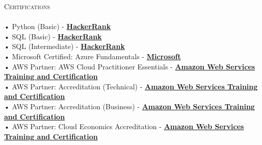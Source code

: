 \documentclass[a4paper]{article}
\newcommand{\lineunder} {
    \vspace*{-8pt} \\
    \hspace*{-18pt} \hrulefill \\
}
\newcommand{\header} [1] {
    {\hspace*{-18pt}\vspace*{6pt} \textsc{#1}}
    \vspace*{-6pt} \lineunder
}
\begin{document}
      \header{Certifications}
      \vspace{1mm}
      • Python (Basic) - \textbf{\href{https://www.hackerrank.com/certificates/bfc07157a748}{HackerRank}}\\
\vspace*{1mm}
      • SQL (Basic) - \textbf{\href{https://www.hackerrank.com/certificates/8501a5b92f0c}{HackerRank}}\\
\vspace*{1mm}
      • SQL (Intermediate) - \textbf{\href{https://www.hackerrank.com/certificates/e3048e67ed0a}{HackerRank}}\\
\vspace*{1mm}
      • Microsoft Certified: Azure Fundamentals - \textbf{\href{https://www.credly.com/badges/b9331203-6ef9-4fd2-911d-e0930648c95c?source=linked\_in\_profile}{Microsoft}}\\
\vspace*{1mm}
      • AWS Partner: AWS Cloud Practitioner Essentials - \textbf{\href{https://drive.google.com/file/d/1of0rvY1uMqwD-5YqXAQzMT767HK\_nPUX/view}{Amazon Web Services Training and Certification}}\\
\vspace*{1mm}
      • AWS Partner: Accreditation (Technical) - \textbf{\href{https://www.credly.com/badges/3885872d-d920-4e07-8885-ea244bc06c49/public\_url}{Amazon Web Services Training and Certification}}\\
\vspace*{1mm}
      • AWS Partner: Accreditation (Business) - \textbf{\href{https://www.credly.com/badges/86cdbee2-ba67-43ba-983c-3935796429e5/public\_url}{Amazon Web Services Training and Certification}}\\
\vspace*{1mm}
      • AWS Partner: Cloud Economics Accreditation - \textbf{\href{https://www.credly.com/badges/87c54f12-9a82-429e-8d87-8b3ecee48b13/public\_url}{Amazon Web Services Training and Certification}}\\
\vspace*{1mm}
      \vspace{2mm}
\end{document}

